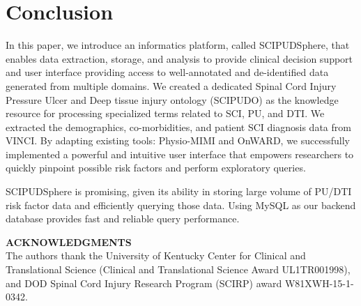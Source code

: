 \documentclass{amia}
\begin{document}

\section{Conclusion}
In this paper, we introduce an informatics platform, called SCIPUDSphere, that enables data extraction, storage, and analysis to provide clinical decision support and user interface providing access to well-annotated and de-identified data generated from multiple domains. We created a dedicated Spinal Cord Injury Pressure Ulcer and Deep tissue injury ontology (SCIPUDO) as the knowledge resource for processing specialized terms related to SCI, PU, and DTI. We extracted the demographics, co-morbidities, and patient SCI diagnosis data from VINCI. By adapting existing tools: Physio-MIMI and OnWARD, we successfully implemented a powerful and intuitive user interface that empowers researchers to quickly pinpoint possible risk factors and perform exploratory queries.

SCIPUDSphere is promising, given its ability in storing large volume of PU/DTI risk factor data and efficiently querying those data. Using MySQL as our backend database provides fast and reliable query performance.


\textbf{ACKNOWLEDGMENTS}\\
The authors thank the University of Kentucky Center for Clinical and Translational Science (Clinical and Translational Science Award UL1TR001998), and DOD Spinal Cord Injury Research Program (SCIRP) award W81XWH-15-1-0342.
\end{document}
